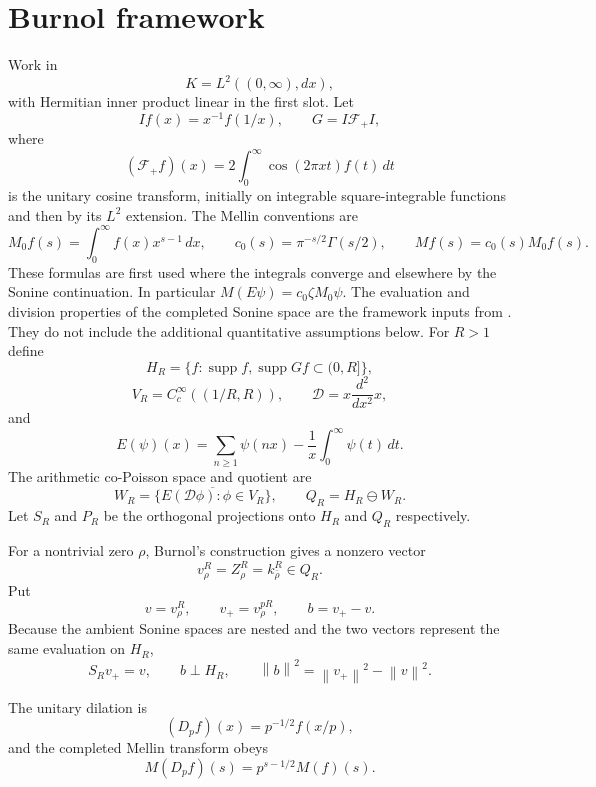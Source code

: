 \documentclass[11pt]{article}
\theoremstyle{remark}
\newcommand{\norm}[1]{\left\lVert #1\right\rVert}
\begin{document}
\section{Burnol framework}
Work in
\[
 K=L^2((0,\infty),dx),
\]
with Hermitian inner product linear in the first slot. Let
\[
 If(x)=x^{-1}f(1/x),\qquad G=I\mathcal F_+I,
\]
where
\[
 (\mathcal F_+f)(x)=2\int_0^\infty \cos(2\pi xt)f(t)\,dt
\]
is the unitary cosine transform, initially on integrable square-integrable
functions and then by its $L^2$ extension. The Mellin conventions are
\[
 M_0f(s)=\int_0^\infty f(x)x^{s-1}\,dx,\qquad
 c_0(s)=\pi^{-s/2}\Gamma(s/2),\qquad M f(s)=c_0(s)M_0f(s).
\]
These formulas are first used where the integrals converge and elsewhere
by the Sonine continuation. In particular $M(E\psi)=c_0\zeta M_0\psi$.
The evaluation and division properties of the completed Sonine space are
the framework inputs from \cite{Burnol2001,Burnol2002Sonine,BurnolCoPoisson2004}.
They do not include the additional quantitative assumptions below. For $R>1$ define
\[
 H_R=\{f:\operatorname{supp}f,\operatorname{supp}Gf\subset(0,R]\},
\]
\[
 V_R=C_c^\infty((1/R,R)),\qquad
 \mathcal D=x\frac{d^2}{dx^2}x,
\]
and
\[
 E(\psi)(x)=\sum_{n\ge1}\psi(nx)-\frac{1}{x}\int_0^\infty\psi(t)\,dt.
\]
The arithmetic co-Poisson space and quotient are
\[
 W_R=\overline{\{E(\mathcal D\phi):\phi\in V_R\}},\qquad
 Q_R=H_R\ominus W_R.
\]
Let $S_R$ and $P_R$ be the orthogonal projections onto $H_R$ and $Q_R$ respectively.

For a nontrivial zero $\rho$, Burnol's construction gives a nonzero vector
\[
 v_\rho^R=Z_\rho^R=k_{\bar\rho}^R\in Q_R.
\]
Put
\[
 v=v_\rho^R,\qquad v_+=v_\rho^{pR},\qquad b=v_+-v.
\]
Because the ambient Sonine spaces are nested and the two vectors represent the same evaluation on $H_R$,
\begin{equation}\label{eq:nested}
 S_Rv_+=v,\qquad b\perp H_R,\qquad
 \norm b^2=\norm{v_+}^2-\norm v^2.
\end{equation}

The unitary dilation is
\[
 (D_pf)(x)=p^{-1/2}f(x/p),
\]
and the completed Mellin transform obeys
\[
 M(D_pf)(s)=p^{s-1/2}M(f)(s).
\]
\end{document}

